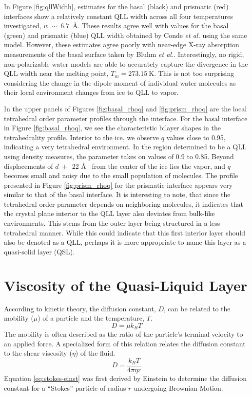 In Figure \ref{fig:qllWidth}, estimates for the basal (black) and
prismatic (red) interfaces show a relatively constant QLL width across
all four temperatures investigated, $w~\sim~6.7$~\AA. These results
agree well with values for the basal (green) and prismatic (blue) QLL
width obtained by Conde \textit{et al.} using the same
model.\cite{Conde2008} However, these estimates agree poorly with
near-edge X-ray absorption measurements of the basal surface taken by
Bluhm \textit{et al.}.\cite{Bluhm2002} Interestingly, no rigid,
non-polarizable water models are able to accurately capture the
divergence in the QLL width near the melting point,
$T_m = 273.15~\mathrm{K}$.\cite{Conde2008} This is not too surprising
considering the change in the dipole moment of individual water
molecules as their local environment changes from ice to QLL to vapor.

In the upper panels of Figures \ref{fig:basal_rhoq} and
\ref{fig:prism_rhoq} are the local tetrahedral order parameter
profiles through the interface. For the basal interface in Figure
\ref{fig:basal_rhoq}, we see the characteristic bilayer shapes in the
tetrahedrality profile. Interior to the ice, we observe $q$ values
close to 0.95, indicating a very tetrahedral environment. In the
region determined to be a QLL using density measures, the parameter
takes on values of 0.9 to 0.85. Beyond displacements of $d~\pm$~22
\AA~ from the center of the ice lies the vapor, and $q$ becomes small
and noisy due to the small population of molecules. The profile
presented in Figure \ref{fig:prism_rhoq} for the prismatic interface
appears very similar to that of the basal interface. It is interesting
to note, that since the tetrahedral order parameter depends on
neighboring molecules, it indicates that the crystal plane interior to
the QLL layer also deviates from bulk-like environments. This stems
from the outer layer being structured in a less tetrahedral
manner. While this could indicate that this first interior layer
should also be denoted as a QLL, perhaps it is more appropriate to
name this layer as a quasi-solid layer (QSL).


\section{Viscosity of the Quasi-Liquid Layer}

According to kinetic theory, the diffusion constant, $D$, can be
related to the mobility ($\mu$) of a particle and the temperature,
$T$.
\begin{equation}
D = \mu k_B T
\end{equation}
The mobility is often described as the ratio of the particle's
terminal velocity to an applied force. A specialized form of
this relation relates the diffusion constant to the shear viscosity
($\eta$) of the fluid.
\begin{equation}\label{eq:stokes-einst}
D = \frac{k_BT}{4\pi \eta r}
\end{equation}
Equation \eqref{eq:stokes-einst} was first derived by Einstein to
determine the diffusion constant for a ``Stokes'' particle of radius
$r$ undergoing Brownian Motion. 

